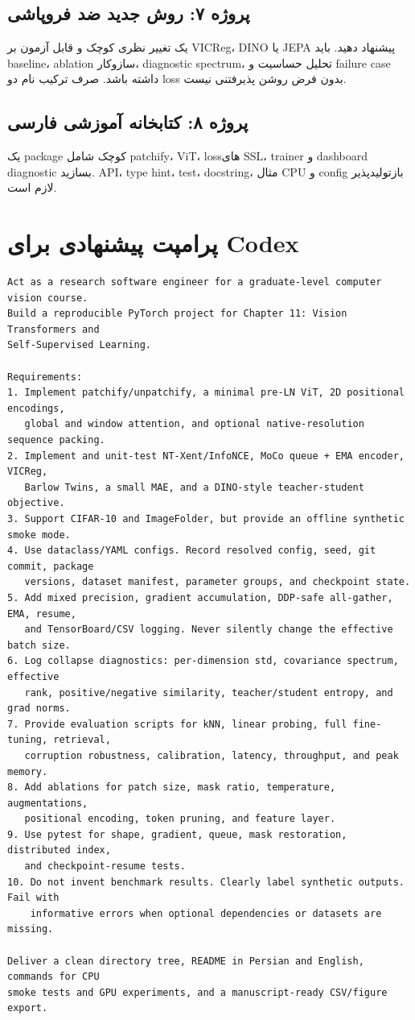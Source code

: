 \documentclass[12pt,openany,oneside]{book}
\begin{document}
\subsection{پروژه ۷: روش جدید ضد فروپاشی}
یک تغییر نظری کوچک و قابل آزمون بر VICReg، DINO یا JEPA پیشنهاد دهید. باید baseline، ablation سازوکار، diagnostic spectrum، تحلیل حساسیت و failure case داشته باشد. صرف ترکیب نام دو loss بدون فرض روشن پذیرفتنی نیست.

\subsection{پروژه ۸: کتابخانه آموزشی فارسی}
یک package کوچک شامل patchify، ViT، lossهای SSL، trainer و dashboard diagnostic بسازید. API، type hint، test، docstring، مثال CPU و config بازتولیدپذیر لازم است.

\section{پرامپت پیشنهادی برای Codex}
\begin{workshopbox}
\begin{latin}
\begin{lstlisting}
Act as a research software engineer for a graduate-level computer vision course.
Build a reproducible PyTorch project for Chapter 11: Vision Transformers and
Self-Supervised Learning.

Requirements:
1. Implement patchify/unpatchify, a minimal pre-LN ViT, 2D positional encodings,
   global and window attention, and optional native-resolution sequence packing.
2. Implement and unit-test NT-Xent/InfoNCE, MoCo queue + EMA encoder, VICReg,
   Barlow Twins, a small MAE, and a DINO-style teacher-student objective.
3. Support CIFAR-10 and ImageFolder, but provide an offline synthetic smoke mode.
4. Use dataclass/YAML configs. Record resolved config, seed, git commit, package
   versions, dataset manifest, parameter groups, and checkpoint state.
5. Add mixed precision, gradient accumulation, DDP-safe all-gather, EMA, resume,
   and TensorBoard/CSV logging. Never silently change the effective batch size.
6. Log collapse diagnostics: per-dimension std, covariance spectrum, effective
   rank, positive/negative similarity, teacher/student entropy, and grad norms.
7. Provide evaluation scripts for kNN, linear probing, full fine-tuning, retrieval,
   corruption robustness, calibration, latency, throughput, and peak memory.
8. Add ablations for patch size, mask ratio, temperature, augmentations,
   positional encoding, token pruning, and feature layer.
9. Use pytest for shape, gradient, queue, mask restoration, distributed index,
   and checkpoint-resume tests.
10. Do not invent benchmark results. Clearly label synthetic outputs. Fail with
    informative errors when optional dependencies or datasets are missing.

Deliver a clean directory tree, README in Persian and English, commands for CPU
smoke tests and GPU experiments, and a manuscript-ready CSV/figure export.
\end{lstlisting}
\end{latin}
\end{workshopbox}
\end{document}
